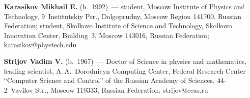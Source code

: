 \Contr

\noindent
\textbf{Karasikov Mikhail E.} (b.\ 1992)~--- 
student, Moscow Institute of Physics and Technology, 9~Institutskiy Per., 
Dolgoprudny, Moscow Region 141700, Russian Federation;  
student, Skolkovo Institute of Science and Technology, Skolkovo Innovation Center,
Building~3, Moscow 143016, Russian Federation; \mbox{karasikov@phystech.edu}

\vspace*{3pt}

\noindent
\textbf{Strijov Vadim V.} (b.\ 1967)~--- 
Doctor of Science in physics and mathematics, leading scientist, 
A.\,A.~Dorodnicyn Computing Center, Federal Research Center ``Computer Science and Control'' 
of the Russian Academy of Sciences, 44-2~Vavilov Str., Moscow 119333, 
Russian Federation; \mbox{strijov@ccas.ru}
\label{end\stat}


\renewcommand{\bibname}{\protect\rm Литература} 